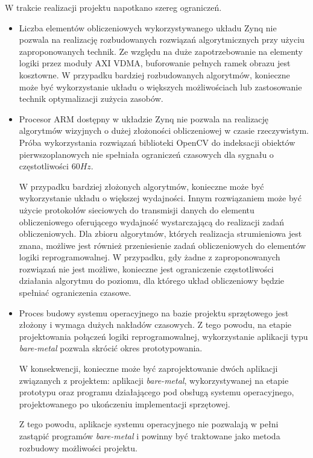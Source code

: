 W trakcie realizacji projektu napotkano szereg ograniczeń. 
\begin{itemize}
	\item Liczba elementów obliczeniowych wykorzystywanego układu Zynq nie pozwala na realizację rozbudowanych rozwiązań algorytmicznych przy użyciu zaproponowanych technik. 
	Ze względu na duże zapotrzebowanie na elementy logiki przez moduły AXI VDMA, buforowanie pełnych ramek obrazu jest kosztowne. 
	W przypadku bardziej rozbudowanych algorytmów, konieczne może być wykorzystanie układu o większych możliwościach lub zastosowanie technik optymalizacji zużycia zasobów.
	
	\item Procesor ARM dostępny w układzie Zynq nie pozwala na realizację algorytmów wizyjnych o dużej złożoności obliczeniowej w  czasie rzeczywistym. 
	Próba wykorzystania rozwiązań biblioteki OpenCV do indeksacji obiektów pierwszoplanowych nie spełniała ograniczeń czasowych dla sygnału o częstotliwości $60Hz$.
	
	W przypadku bardziej złożonych algorytmów, konieczne może być wykorzystanie układu o większej wydajności. 
	Innym rozwiązaniem może być użycie protokołów sieciowych do transmisji danych do elementu obliczeniowego oferującego wydajność wystarczającą do realizacji zadań obliczeniowych. 
	Dla zbioru algorytmów, których realizacja strumieniowa jest znana, możliwe jest również przeniesienie zadań obliczeniowych do elementów logiki reprogramowalnej. 
	W przypadku, gdy żadne z zaproponowanych rozwiązań nie jest możliwe, konieczne jest ograniczenie częstotliwości działania algorytmu do poziomu, dla którego układ obliczeniowy będzie spełniać ograniczenia czasowe.
	
	\item Proces budowy systemu operacyjnego na bazie projektu sprzętowego jest złożony i wymaga dużych nakładów czasowych. 
	Z tego powodu, na etapie projektowania połączeń logiki reprogramowalnej, wykorzystanie aplikacji typu \textit{bare-metal} pozwala skrócić okres prototypowania.
	
	W konsekwencji, konieczne może być zaprojektowanie dwóch aplikacji związanych z projektem: aplikacji \textit{bare-metal}, wykorzystywanej na etapie prototypu oraz programu działającego pod obsługą systemu operacyjnego, projektowanego po ukończeniu implementacji sprzętowej.
	
	Z tego powodu, aplikacje systemu operacyjnego nie pozwalają w pełni zastąpić programów \textit{bare-metal} i powinny być traktowane jako metoda rozbudowy możliwości projektu.
\end{itemize}

